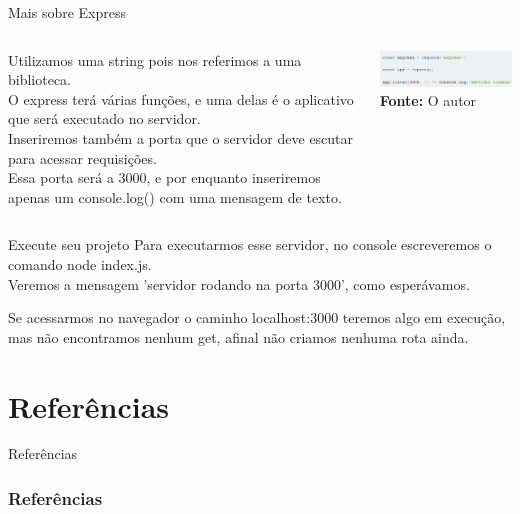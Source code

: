 \documentclass{beamer}
\begin{document}
    \begin{frame}{Mais sobre Express}

      \begin{columns}[onlytextwidth]
         Utilizamos uma string pois nos referimos a uma biblioteca.\\
         O express terá várias funções, e uma delas é o aplicativo que será executado no servidor. \\
         Inseriremos também a porta que o servidor deve escutar para acessar requisições. \\
         Essa porta será a 3000, e por enquanto inseriremos apenas um console.log() com uma mensagem de texto.        
          \vspace{0.5cm}
	
            \includegraphics[width=65mm]{resources/aula2_1.png}\\
            \tiny{\textbf{Fonte:} O autor}

      \end{columns}
    \end{frame}
     \begin{frame}{Execute seu projeto}
    Para executarmos esse servidor, no console escreveremos o comando \alert{node index.js}. \\
    Veremos a mensagem 'servidor rodando na porta 3000', como esperávamos.
    \vspace{0.5cm}

	Se acessarmos no navegador o caminho \alert{localhost:3000} teremos algo em execução, mas não encontramos nenhum get, afinal não criamos nenhuma rota ainda.
    \end{frame}
\section{Referências}
    \begin{frame}{Referências}%
\frametitle{Referências}
\small
\begin{center}
\tiny


\end{center}
\end{frame}
\end{document}
